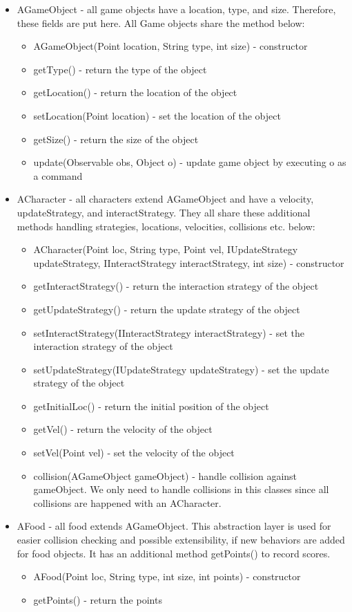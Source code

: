 \documentclass[letterpaper, 11pt]{article}
\begin{document}
\begin{itemize}
  \item AGameObject - all game objects have a location, type, and size. Therefore, these fields are put here. All Game objects share the method below:
  \begin{itemize}
    \item AGameObject(Point location, String type, int size) - constructor
    \item getType() - return the type of the object
    \item getLocation() - return the location of the object
    \item setLocation(Point location) - set the location of the object
    \item getSize() - return the size of the object
    \item update(Observable obs, Object o) - update game object by executing o as a command
  \end{itemize}
  \item ACharacter - all characters extend AGameObject and have a velocity, updateStrategy, and interactStrategy. They all share these additional methods handling strategies, locations, velocities, collisions etc. below:
  \begin{itemize}
    \item ACharacter(Point loc, String type, Point vel, IUpdateStrategy updateStrategy, IInteractStrategy interactStrategy, int size) - constructor
    \item getInteractStrategy() - return the interaction strategy of the object
    \item getUpdateStrategy() - return the update strategy of the object
    \item setInteractStrategy(IInteractStrategy interactStrategy) - set the interaction strategy of the object
    \item setUpdateStrategy(IUpdateStrategy updateStrategy) - set the update strategy of the object
    \item getInitialLoc() - return the initial position of the object
    \item getVel() - return the velocity of the object
    \item setVel(Point vel) - set the velocity of the object
    \item collision(AGameObject gameObject) - handle collision against gameObject. We only need to handle collisions in this classes since all collisions are happened with an ACharacter.
  \end{itemize}
  \item AFood - all food extends AGameObject. This abstraction layer is used for easier collision checking and possible extensibility, if new behaviors are added for food objects. It has an additional method getPoints() to record scores.
  \begin{itemize}
  \item AFood(Point loc, String type, int size, int points) - constructor
  \item getPoints() - return the points
  \end{itemize}
  

\end{itemize}
\end{document}
